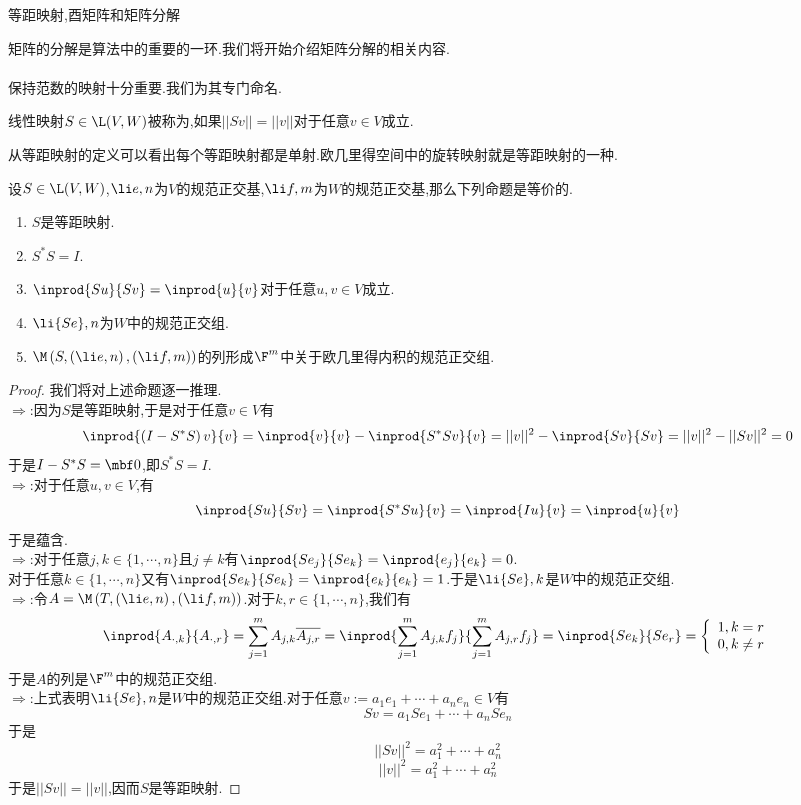\documentclass{ctexart}
\begin{document}
\pagestyle{empty}
\begin{center}\large 等距映射,酉矩阵和矩阵分解\end{center}
矩阵的分解是算法中的重要的一环.我们将开始介绍矩阵分解的相关内容.\\
\\
保持范数的映射十分重要.我们为其专门命名.
\begin{definition}[1.1 定义:等距映射]
    线性映射$S\in\L(V,W)$被称为,如果$||Sv||=||v||$对于任意$v\in V$成立.
\end{definition}\noindent
从等距映射的定义可以看出每个等距映射都是单射.欧几里得空间中的旋转映射就是等距映射的一种.
\begin{formal}[1.2 等距映射的性质]
    设$S\in\L(V,W)$,$\li e,n$为$V$的规范正交基,$\li f,m$为$W$的规范正交基,那么下列命题是等价的.
    \begin{enumerate}[label=\tbf{(\alph*)}]
        \item $S$是等距映射.
        \item $S^*S=I$.
        \item $\inprod{Su}{Sv}=\inprod{u}{v}$对于任意$u,v\in V$成立.
        \item $\li{Se},n$为$W$中的规范正交组.
        \item $\M\left(S,\left(\li e,n\right),\left(\li f,m\right)\right)$的列形成$\F^m$中关于欧几里得内积的规范正交组.
    \end{enumerate}
\end{formal}
\begin{proof}
    我们将对上述命题逐一推理.\\
    $\Rightarrow$:因为$S$是等距映射,于是对于任意$v\in V$有
    \[\inprod{\left(I-S^*S\right)v}{v}=\inprod{v}{v}-\inprod{S^*Sv}{v}=||v||^2-\inprod{Sv}{Sv}=||v||^2-||Sv||^2=0\]
    于是$I-S^*S=\mbf0$,即$S^*S=I$.\\
    $\Rightarrow$:对于任意$u,v\in V$,有
    \[\inprod{Su}{Sv}=\inprod{S^*Su}{v}=\inprod{Iu}{v}=\inprod{u}{v}\]
    于是蕴含.\\
    $\Rightarrow$:对于任意$j,k\in\{1,\cdots,n\}$且$j\neq k$有$\inprod{Se_j}{Se_k}=\inprod{e_j}{e_k}=0$.\\
    对于任意$k\in\{1,\cdots,n\}$又有$\inprod{Se_k}{Se_k}=\inprod{e_k}{e_k}=1$.于是$\li{Se},k$是$W$中的规范正交组.\\
    $\Rightarrow$:令$A=\M\left(T,\left(\li e,n\right),\left(\li f,m\right)\right)$.对于$k,r\in\{1,\cdots,n\}$,我们有
    \[\inprod{A_{\cdot,k}}{A_{\cdot,r}}=\sum_{j=1}^{m}A_{j,k}\overline{A_{j,r}}=\inprod{\sum_{j=1}^{m}A_{j,k}f_j}{\sum_{j=1}^{m}A_{j,r}f_j}=\inprod{Se_k}{Se_r}
    =\left\{\begin{array}{l}
        1,k=r\\0,k\neq r
    \end{array}\right.\]
    于是$A$的列是$\F^m$中的规范正交组.\\
    $\Rightarrow$:上式表明$\li {Se},n$是$W$中的规范正交组.对于任意$v:=a_1e_1+\cdots+a_ne_n\in V$有
    \[Sv=a_1Se_1+\cdots+a_nSe_n\]
    于是
    \[||Sv||^2=a_1^2+\cdots+a_n^2\]
    \[||v||^2=a_1^2+\cdots+a_n^2\]
    于是$||Sv||=||v||$,因而$S$是等距映射.
\end{proof}\noindent
\end{document}
